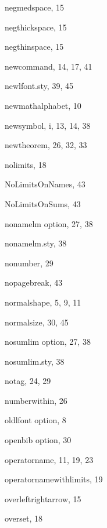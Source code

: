 \begin{theindex}
  \item {\ptt \bslash negmedspace}, 15
  \item {\ptt \bslash negthickspace}, 15
  \item {\ptt \bslash negthinspace}, 15
  \item {\ptt \bslash newcommand}, 14, 17, 41
  \item {\ptt {}newlfont.sty}, 39, 45
  \item {\ptt \bslash newmathalphabet}, 10
  \item {\ptt \bslash newsymbol}, i, 13, 14, 38
  \item {\ptt \bslash newtheorem}, 26, 32, 33
  \item {\ptt \bslash nolimits}, 18
  \item {\ptt \bslash NoLimitsOnNames}, 43
  \item {\ptt \bslash NoLimitsOnSums}, 43
  \item {\ptt {}nonamelm} option, 27, 38
  \item {\ptt {}nonamelm.sty}, 38
  \item {\ptt \bslash nonumber}, 29
  \item {\ptt \bslash nopagebreak}, 43
  \item {\ptt \bslash normalshape}, 5, 9, 11
  \item {\ptt \bslash normalsize}, 30, 45
  \item {\ptt {}nosumlim} option, 27, 38
  \item {\ptt {}nosumlim.sty}, 38
  \item {\ptt \bslash notag}, 24, 29
  \item {\ptt \bslash numberwithin}, 26

  \indexspace

  \item {\ptt {}oldlfont} option, 8
  \item {\ptt {}openbib} option, 30
  \item {\ptt \bslash operatorname}, 11, 19, 23
  \item {\ptt \bslash operatornamewithlimits}, 19
  \item {\ptt \bslash overleftrightarrow}, 15
  \item {\ptt \bslash overset}, 18

  \indexspace


\end{theindex}

